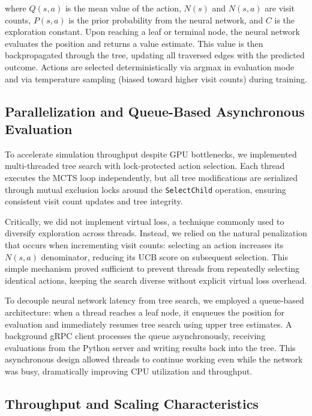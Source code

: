 \documentclass[12pt]{article}
\begin{document}
where $Q(s, a)$ is the mean value of the action, $N(s)$ and $N(s, a)$ are visit counts, $P(s, a)$ is the prior probability from the neural network, and $C$ is the exploration constant. Upon reaching a leaf or terminal node, the neural network evaluates the position and returns a value estimate. This value is then backpropagated through the tree, updating all traversed edges with the predicted outcome. Actions are selected deterministically via argmax in evaluation mode and via temperature sampling (biased toward higher visit counts) during training.

\subsection{Parallelization and Queue-Based Asynchronous Evaluation}

To accelerate simulation throughput despite GPU bottlenecks, we implemented multi-threaded tree search with lock-protected action selection. Each thread executes the MCTS loop independently, but all tree modifications are serialized through mutual exclusion locks around the \texttt{SelectChild} operation, ensuring consistent visit count updates and tree integrity.

Critically, we did not implement virtual loss, a technique commonly used to diversify exploration across threads. Instead, we relied on the natural penalization that occurs when incrementing visit counts: selecting an action increases its $N(s, a)$ denominator, reducing its UCB score on subsequent selection. This simple mechanism proved sufficient to prevent threads from repeatedly selecting identical actions, keeping the search diverse without explicit virtual loss overhead.

To decouple neural network latency from tree search, we employed a queue-based architecture: when a thread reaches a leaf node, it enqueues the position for evaluation and immediately resumes tree search using upper tree estimates. A background gRPC client processes the queue asynchronously, receiving evaluations from the Python server and writing results back into the tree. This asynchronous design allowed threads to continue working even while the network was busy, dramatically improving CPU utilization and throughput.

\subsection{Throughput and Scaling Characteristics}
\end{document}
